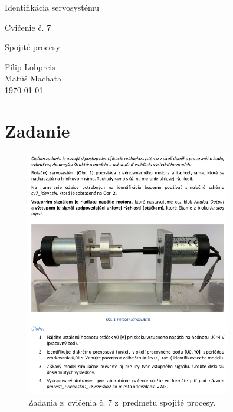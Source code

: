 \documentclass{article}
\begin{document}
\begin{titlepage}
	\null\vfill

	\begin{center}
		{\Huge Identifikácia servosystému }
		\vskip 2cm

		{\Large Cvičenie č. 7}
		\vskip 0.5cm

		{\large Spojité procesy}
	\end{center}

	\vfill
	\vfill

	\begin{flushright}
		Filip Lobpreis \\
		Matúš Machata \\
		\small\today\\
	\end{flushright}
	\hfill
\end{titlepage}

\thispagestyle{empty}
\clearpage

\tableofcontents
\thispagestyle{empty}
\clearpage

\section{Zadanie}
\label{sec:zadanie}

\begin{figure}[!htbp]
	\begin{center}
		\includegraphics[width=0.8\textwidth]{./include/zadanie.png}
	\end{center}
	\caption{Zadania z~cvičenia č. 7 z~predmetu spojité procesy.}
	\label{fig:zadanie1}
\end{figure}
\end{document}

